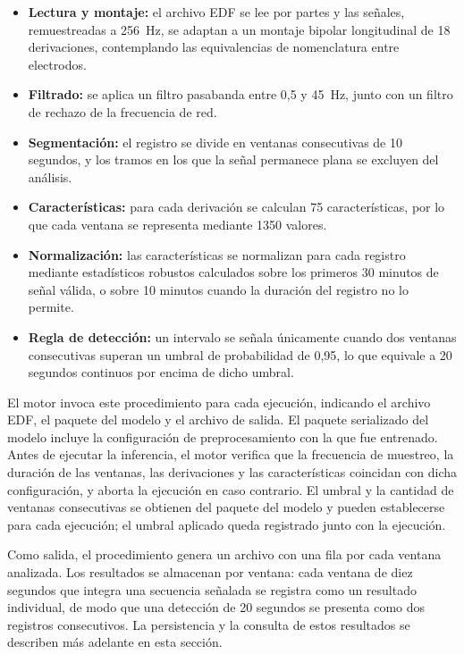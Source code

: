 \begin{itemize}
    \item \textbf{Lectura y montaje:} el archivo EDF se lee por partes y las señales, remuestreadas a 256~Hz, se adaptan a un montaje bipolar longitudinal de 18 derivaciones, contemplando las equivalencias de nomenclatura entre electrodos.
    \item \textbf{Filtrado:} se aplica un filtro pasabanda entre 0,5 y 45~Hz, junto con un filtro de rechazo de la frecuencia de red.
    \item \textbf{Segmentación:} el registro se divide en ventanas consecutivas de 10 segundos, y los tramos en los que la señal permanece plana se excluyen del análisis.
    \item \textbf{Características:} para cada derivación se calculan 75 características, por lo que cada ventana se representa mediante 1350 valores.
    \item \textbf{Normalización:} las características se normalizan para cada registro mediante estadísticos robustos calculados sobre los primeros 30 minutos de señal válida, o sobre 10 minutos cuando la duración del registro no lo permite.
    \item \textbf{Regla de detección:} un intervalo se señala únicamente cuando dos ventanas consecutivas superan un umbral de probabilidad de 0,95, lo que equivale a 20 segundos continuos por encima de dicho umbral.
\end{itemize}

El motor invoca este procedimiento para cada ejecución, indicando el archivo EDF, el paquete del modelo y el archivo de salida.
El paquete serializado del modelo incluye la configuración de preprocesamiento con la que fue entrenado.
Antes de ejecutar la inferencia, el motor verifica que la frecuencia de muestreo, la duración de las ventanas, las derivaciones y las características coincidan con dicha configuración, y aborta la ejecución en caso contrario.
El umbral y la cantidad de ventanas consecutivas se obtienen del paquete del modelo y pueden establecerse para cada ejecución; el umbral aplicado queda registrado junto con la ejecución.

Como salida, el procedimiento genera un archivo con una fila por cada ventana analizada.
Los resultados se almacenan por ventana: cada ventana de diez segundos que integra una secuencia señalada se registra como un resultado individual, de modo que una detección de 20 segundos se presenta como dos registros consecutivos.
La persistencia y la consulta de estos resultados se describen más adelante en esta sección.

